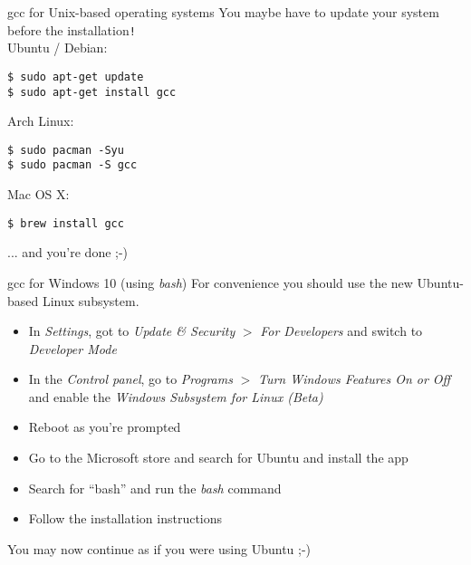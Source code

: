 \begin{frame}[fragile = singleslide = singleslide]{gcc for Unix-based operating systems}
	You maybe have to update your system before the installation\verb|!| \\
	Ubuntu / Debian:
	\begin{lstlisting}[numbers=none]
$ sudo apt-get update
$ sudo apt-get install gcc
    \end{lstlisting}
	\bigskip
	Arch Linux:
	\begin{lstlisting}[numbers=none]
$ sudo pacman -Syu
$ sudo pacman -S gcc
    \end{lstlisting}
	\bigskip
	Mac OS X:
	\begin{lstlisting}[numbers=none]
$ brew install gcc
    \end{lstlisting}
	\bigskip
	... and you're done ;-)
\end{frame}

\begin{frame}{gcc for Windows 10 (using \textit{bash})}
	For convenience you should use the new Ubuntu-based Linux subsystem.\\
	\bigskip
	\begin{itemize}
		\item In \textit{Settings}, got to \textit{Update \& Security} $>$ \textit{For Developers}
			and switch to \textit{Developer Mode}
		\item In the \textit{Control panel}, go to \textit{Programs} $>$ \textit{Turn Windows Features On or Off}
			and enable the \textit{Windows Subsystem for Linux (Beta)}
		\item Reboot as you're prompted
		\item Go to the Microsoft store and search for Ubuntu and install the app
		\item Search for ``bash'' and run the \textit{bash} command
		\item Follow the installation instructions
	\end{itemize}
	\bigskip
	You may now continue as if you were using Ubuntu ;-)
\end{frame}

